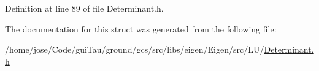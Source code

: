 Definition at line 89 of file Determinant.\-h.



The documentation for this struct was generated from the following file\-:\begin{DoxyCompactItemize}
\item 
/home/jose/\-Code/gui\-Tau/ground/gcs/src/libs/eigen/\-Eigen/src/\-L\-U/\hyperlink{_determinant_8h}{Determinant.\-h}\end{DoxyCompactItemize}
